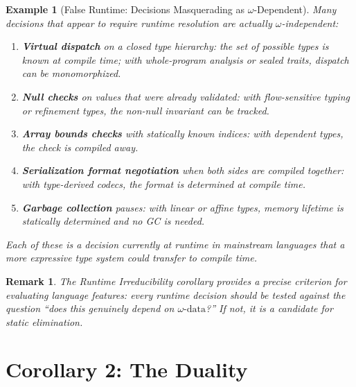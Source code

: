 \documentclass[11pt]{article}
\newtheorem{remark}[theorem]{Remark}
\newtheorem{example}[theorem]{Example}
\newcommand{\omegadata}{\omega\text{-data}}
\begin{document}
\begin{example}[False Runtime: Decisions Masquerading as $\omega$-Dependent]
\label{ex:false-runtime}
Many decisions that \emph{appear} to require runtime resolution are actually
$\omega$-independent:

\begin{enumerate}[nosep]
  \item \textbf{Virtual dispatch} on a closed type hierarchy: the set of possible
    types is known at compile time; with whole-program analysis or sealed traits,
    dispatch can be monomorphized.

  \item \textbf{Null checks} on values that were already validated: with flow-sensitive
    typing or refinement types, the non-null invariant can be tracked.

  \item \textbf{Array bounds checks} with statically known indices: with dependent
    types, the check is compiled away.

  \item \textbf{Serialization format negotiation} when both sides are compiled together:
    with type-derived codecs, the format is determined at compile time.

  \item \textbf{Garbage collection} pauses: with linear or affine types, memory
    lifetime is statically determined and no GC is needed.
\end{enumerate}
Each of these is a decision currently at runtime in mainstream languages that a more
expressive type system could transfer to compile time.
\end{example}

\begin{remark}
The Runtime Irreducibility corollary provides a precise criterion for evaluating
language features: every runtime decision should be tested against the question ``does
this genuinely depend on $\omegadata$?'' If not, it is a candidate for static
elimination.
\end{remark}


\section{Corollary 2: The Duality}
\label{sec:corollary2}
\end{document}

